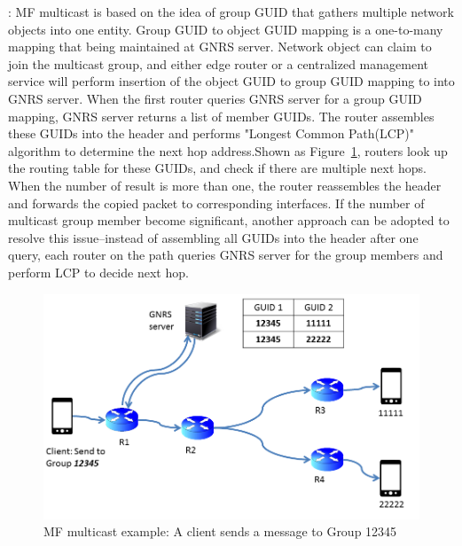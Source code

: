\vspace{1mm}: MF multicast is based on the idea of group GUID that gathers multiple network objects into one entity. Group GUID  to object GUID mapping is a one-to-many mapping that being maintained at GNRS server. Network object can claim to join the multicast group, and either edge router or a centralized management service will perform insertion of the object GUID to group GUID mapping to into GNRS server. When the first router queries GNRS server for a group GUID mapping, GNRS server returns a list of member GUIDs. The router assembles these GUIDs into the header and performs "Longest Common Path(LCP)" algorithm to determine the next hop address.Shown as Figure~\ref{fig:multicast}, routers look up the routing table for these GUIDs, and check if there are multiple next hops. When the number of result is more than one, the router reassembles the header and forwards the copied packet to corresponding interfaces. If the number of multicast group member become significant, another approach can be adopted to resolve this issue--instead of assembling all GUIDs into the header after one query, each router on the path queries GNRS server for the group members and perform LCP to decide next hop.
\begin{figure}
\centering
\includegraphics[width=\columnwidth]{figure/multicast.png}
\caption{\label{fig:multicast}MF multicast example: A client sends a message to Group 12345}
\end{figure}
